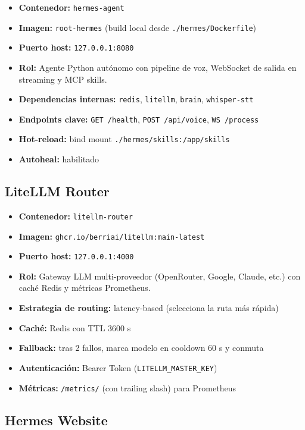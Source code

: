 \documentclass[11pt,a4paper]{article}
\newcommand{\dato}[2]{\textbf{\color{hermesblue}#1:} #2}
\begin{document}
\begin{itemize}[leftmargin=*,itemsep=1pt]
\item \dato{Contenedor}{\texttt{hermes-agent}}
\item \dato{Imagen}{\texttt{root-hermes} (build local desde \texttt{./hermes/Dockerfile})}
\item \dato{Puerto host}{\texttt{127.0.0.1:8080}}
\item \dato{Rol}{Agente Python autónomo con pipeline de voz, WebSocket de salida en streaming y MCP skills.}
\item \dato{Dependencias internas}{\texttt{redis}, \texttt{litellm}, \texttt{brain}, \texttt{whisper-stt}}
\item \dato{Endpoints clave}{\texttt{GET /health}, \texttt{POST /api/voice}, \texttt{WS /process}}
\item \dato{Hot-reload}{bind mount \texttt{./hermes/skills:/app/skills}}
\item \dato{Autoheal}{habilitado}
\end{itemize}

\subsection{LiteLLM Router}

\begin{itemize}[leftmargin=*,itemsep=1pt]
\item \dato{Contenedor}{\texttt{litellm-router}}
\item \dato{Imagen}{\texttt{ghcr.io/berriai/litellm:main-latest}}
\item \dato{Puerto host}{\texttt{127.0.0.1:4000}}
\item \dato{Rol}{Gateway LLM multi-proveedor (OpenRouter, Google, Claude, etc.) con caché Redis y métricas Prometheus.}
\item \dato{Estrategia de routing}{latency-based (selecciona la ruta más rápida)}
\item \dato{Caché}{Redis con TTL 3600 s}
\item \dato{Fallback}{tras 2 fallos, marca modelo en cooldown 60 s y conmuta}
\item \dato{Autenticación}{Bearer Token (\texttt{LITELLM\_MASTER\_KEY})}
\item \dato{Métricas}{\texttt{/metrics/} (con trailing slash) para Prometheus}
\end{itemize}

\subsection{Hermes Website}
\end{document}
